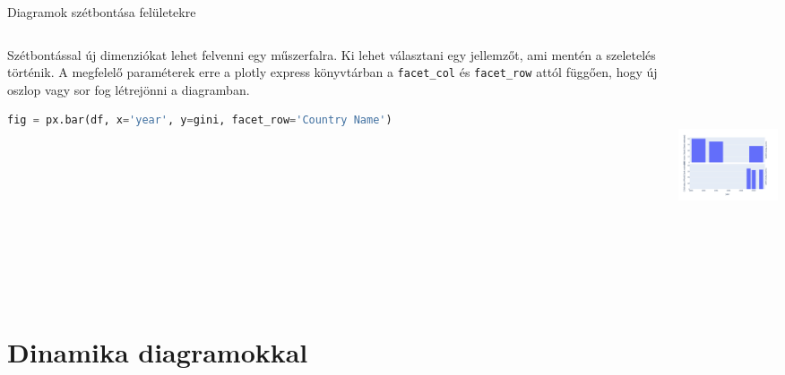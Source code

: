 \documentclass[english, aspectratio=169]{beamer}
\makeatletter
\let\origtableofcontents=\tableofcontents
\def\tableofcontents{\@ifnextchar[{\origtableofcontents}{\gobbletableofcontents}}
\def\gobbletableofcontents#1{\origtableofcontents}
\makeatother
\begin{document}
\begin{frame}[fragile]{Diagramok szétbontása felületekre}
	\begin{columns}
		\begin{column}{.5\textwidth}
			Szétbontással új dimenziókat lehet felvenni egy műszerfalra. Ki lehet választani egy jellemzőt, ami mentén a szeletelés történik. A megfelelő paraméterek erre a plotly express könyvtárban a \texttt{facet\_col} és \texttt{facet\_row} attól függően, hogy új oszlop vagy sor fog létrejönni a diagramban. \par\medskip
			\begin{lstlisting}[language=python]
fig = px.bar(df, x='year', y=gini, facet_row='Country Name')				
			\end{lstlisting}
		\end{column}
		\begin{column}{.5\textwidth}
			\begin{center}
				\includegraphics[width=7cm, height=7cm, keepaspectratio]{images/plots_23.png}
			\end{center}
		\end{column}
	\end{columns}
\end{frame}

\section{Dinamika diagramokkal}

\begin{frame}{}
	\tableofcontents[currentsection]
\end{frame}
\end{document}
